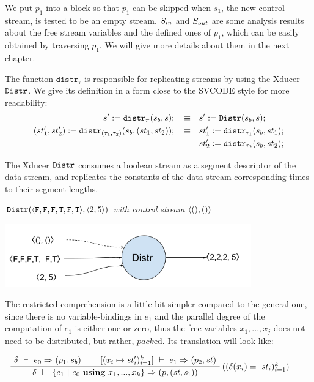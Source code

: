 We put $p_1$ into a \wc block so that $p_1$ can be skipped when $s_1$, the new control stream, is tested to be an empty stream.
$\Sin$ and $\Sout$  are some analysis results about the free stream variables and the defined ones of $p_1$, which can be easily obtained by traversing $p_1$. We will give more details about them in the next chapter.

The function $\mathtt{distr}_{\tau}$ is responsible for replicating streams by using the Xducer $\distr$. 
We give its definition in a form close to the SVCODE style for more readability:
\begin{align*}
	s' := \Distr{s_b}{s}{\pi}; \quad \equiv & \quad s' := \distrf{s_b}{s}; \\
	(st'_1,st'_2)  := \Distr{s_b}{(st_1,st_2)}{(\tau_1,\tau_2)}; \quad \equiv & \quad st_1' := \Distr{s_b}{st_1}{\tau_1}; \\ 
	&\quad st_2' := \Distr{s_b}{st_2}{\tau_2};
\end{align*}

The Xducer $\distr$ consumes a boolean stream as a segment descriptor of the data stream, and replicates the constants of the data stream corresponding times to their segment lengths.
\begin{example} \emph{$\distrf{\<\F,\F,\F,\T,\F,\T\'>}{\< 2,5 \'>}$ with control stream $\< (),() \'>$}\\
	\begin{center}
		\includegraphics[width=0.8\textwidth]{fig/distrxducer.png}
	\end{center}
\end{example}



The restricted comprehension is a little bit simpler compared to the general one, since there is no variable-bindings in $e_1$ and the parallel degree of the computation of $e_1$ is either one or zero, thus the free variables $x_1,...,x_j$ does not need to be distributed, but rather, $pack$ed. Its translation will look like:

$$\PT{
	\AC{\Trans{\del}{e_0}{}{}{(p_1,s_b)}}
	\AC{\Trans{[\k{x_i \|-> \st'_i}]}{e_1}{}{}{\sfun{p_2}{\st}}}
	\RiLa{(\k{\del(x_i) = \ \st_i})}		
	\BC{\Trans{\del}{\RComp{e_1}{e_0}{\usevarsk}}{}{}
		{ \sfun{p} {(\st,\s_1)}}}
}$$


